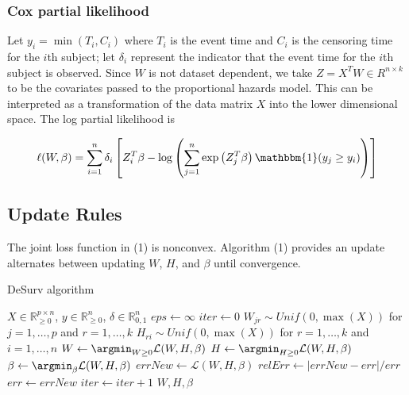 \documentclass[
]{article}
\begin{document}
\subsubsection{Cox partial likelihood}\label{cox-partial-likelihood}

Let \(y_i = \min(T_i,C_i)\) where \(T_i\) is the event time and \(C_i\)
is the censoring time for the \(i\)th subject; let \(\delta_i\)
represent the indicator that the event time for the \(i\)th subject is
observed. Since \(W\) is not dataset dependent, we take
\(Z=X^TW \in R^{n \times k}\) to be the covariates passed to the
proportional hazards model. This can be interpreted as a transformation
of the data matrix \(X\) into the lower dimensional space. The log
partial likelihood is

\begin{equation}
    \ell(W,\beta) = \sum_{i=1}^n \delta_i \left[Z_i^T\beta - \log\left(\sum_{j=1}^n \exp \left(Z_j^T\beta\right) \mathbbm{1} (y_j \geq y_i) \right)\right]
\end{equation}

\subsection*{Update Rules}\label{update-rules}

The joint loss function in (1) is nonconvex. Algorithm (1) provides an
update alternates between updating \(W\), \(H\), and \(\beta\) until
convergence.

\begin{algorithm}
    \caption{DeSurv algorithm}\label{deSurv}

    \begin{algorithmic}[1]
        \Require $X \in \mathbb{R}_{\geq 0}^{p \times n}$, $y \in \mathbb{R}^n_{\geq 0}$, $\delta \in \mathbb{R}_{0,1}^{n}$
        \State $eps \gets \infty$
        \State $iter \gets 0$
        \State $W_{jr} \sim Unif(0,\max(X))$ for $j=1,\dots,p$ and $r=1,\dots, k$
        \State $H_{ri} \sim Unif(0, \max(X))$ for $r=1,\dots,k$ and $i=1,\dots,n$
            \State $W \gets \argmin_{W \geq 0} \mathcal{L}(W,H,\beta)$
            \State $H \gets \argmin_{H \geq 0} \mathcal{L}(W,H,\beta)$
            \State $\beta \gets \argmin_{\beta} \mathcal{L}(W,H,\beta)$
            \State $errNew \gets \mathcal{L}(W,H,\beta)$
            \State $relErr \gets |errNew - err|/err$
            \State $err \gets errNew$
            \State $iter \gets iter + 1$
        \EndWhile
        \State \Return $W, H, \beta$
    \end{algorithmic}
\end{algorithm}
\end{document}
